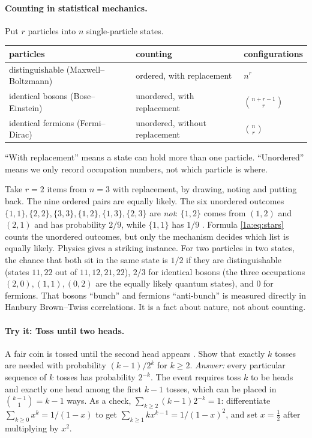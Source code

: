 \paragraph{Counting in statistical mechanics.}
Put $r$ particles into $n$ single-particle states.
\begin{center}
\small
\begin{tabular}{@{}lll@{}}
\toprule
particles & counting & configurations\\
\midrule
distinguishable (Maxwell--Boltzmann) & ordered, with replacement & $n^r$\\
identical bosons (Bose--Einstein) & unordered, with replacement & $\binom{n+r-1}{r}$\\
identical fermions (Fermi--Dirac) & unordered, without replacement & $\binom nr$\\
\bottomrule
\end{tabular}
\end{center}
``With replacement'' means a state can hold more than one particle.
``Unordered'' means we only record occupation numbers, not which particle is where.

\begin{pitfall}
Take $r=2$ items from $n=3$ with replacement, by drawing, noting and putting
back. The nine ordered pairs are equally likely. The six unordered outcomes
$\{1,1\},\{2,2\},\{3,3\},\{1,2\},\{1,3\},\{2,3\}$ are \emph{not}: $\{1,2\}$ comes
from $(1,2)$ and $(2,1)$ and has probability $2/9$, while $\{1,1\}$ has $1/9$
. Formula \eqref{1a:eq:stars} counts the
unordered outcomes, but only the mechanism decides which list is equally likely.
Physics gives a striking instance. For two particles in two states, the chance
that both sit in the same state is $1/2$ if they are distinguishable (states
$11,22$ out of $11,12,21,22$), $2/3$ for identical bosons (the three
occupations $(2,0),(1,1),(0,2)$ are the equally likely quantum states), and $0$
for fermions. That bosons ``bunch'' and fermions ``anti-bunch'' is measured
directly in Hanbury Brown--Twiss correlations. It is a fact about nature, not
about counting.
\end{pitfall}

\paragraph{Try it: Toss until two heads.}
A fair coin is tossed until the second head appears .
Show that exactly $k$ tosses are needed with probability $(k-1)/2^k$ for
$k\ge2$. \emph{Answer:} every particular sequence of $k$ tosses has probability
$2^{-k}$. The event requires toss $k$ to be heads and exactly one head among the
first $k-1$ tosses, which can be placed in $\binom{k-1}{1}=k-1$ ways. As a check,
$\sum_{k\ge2}(k-1)2^{-k}=1$: differentiate $\sum_{k\ge0}x^k=1/(1-x)$ to get
$\sum_{k\ge1}kx^{k-1}=1/(1-x)^2$, and set $x=\tfrac12$ after multiplying by $x^2$.

